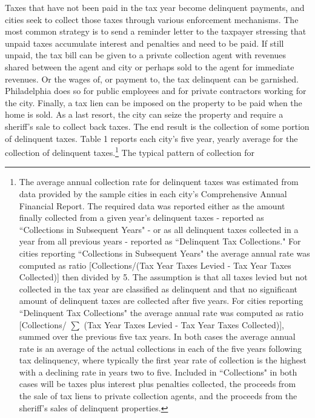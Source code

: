 \documentclass[12pt,titlepage]{article}
\begin{document}
Taxes that have not been paid in the tax year become delinquent
payments, and cities seek to collect those taxes through various
enforcement mechanisms.  The most common strategy is to send a
reminder letter to the taxpayer stressing that unpaid taxes accumulate
interest and penalties and need to be paid.  If still unpaid, the tax
bill can be given to a private collection agent with revenues shared
between the agent and city or perhaps sold to the agent for immediate
revenues.  Or the wages of, or payment to, the tax delinquent can be
garnished.  Philadelphia does so for public employees and for private
contractors working for the city.  Finally, a tax lien can be imposed
on the property to be paid when the home is sold.  As a last resort,
the city can seize the property and require a sheriff's sale to
collect back taxes.  The end result is the collection of some portion
of delinquent taxes.  Table 1 reports each city's five year, yearly
average for the collection of delinquent taxes.\footnote{The average
  annual collection rate for delinquent taxes was estimated from data
  provided by the sample cities in each city's Comprehensive Annual
  Financial Report.  The required data was reported either as the
  amount finally collected from a given year's delinquent taxes -
  reported as ``Collections in Subsequent Years" - or as all
  delinquent taxes collected in a year from all previous years -
  reported as ``Delinquent Tax Collections."  For cities reporting
  ``Collections in Subsequent Years" the average annual rate was
  computed as ratio [Collections/(Tax Year Taxes Levied - Tax Year
    Taxes Collected)] then divided by 5.  The assumption is that all
  taxes levied but not collected in the tax year are classified as
  delinquent and that no significant amount of delinquent taxes are
  collected after five years.  For cities reporting ``Delinquent Tax
  Collections" the average annual rate was computed as ratio
  [Collections/ $\sum$ (Tax Year Taxes Levied - Tax Year Taxes
    Collected)], summed over the previous five tax years.  In both
  cases the average annual rate is an average of the actual
  collections in each of the five years following tax delinquency,
  where typically the first year rate of collection is the highest
  with a declining rate in years two to five.  Included in
  ``Collections" in both cases will be taxes plus interest plus
  penalties collected, the proceeds from the sale of tax liens to
  private collection agents, and the proceeds from the sheriff's sales
  of delinquent properties.} The typical pattern of collection for
\end{document}
